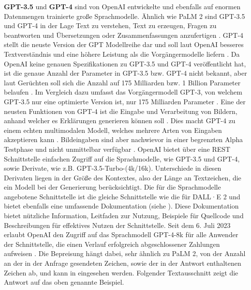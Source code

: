\textbf{GPT-3.5} \cite{openai-gpt-sep-2021} und \textbf{GPT-4} \cite{openai-gpt-sep-2021} sind von OpenAI entwickelte und ebenfalls auf enormen Datenmengen trainierte große Sprachmodelle.
Ähnlich wie PaLM 2 sind GPT-3.5 und GPT-4 in der Lage Text zu verstehen, Text zu erzeugen, Fragen zu beantworten und Übersetzungen oder Zusammenfassungen anzufertigen \cite{gpt3-paper}.
GPT-4 stellt die neuste Version der GPT Modellreihe dar und soll laut OpenAI besseres Textverständnis und eine höhere Leistung als die Vorgängermodelle liefern \cite{openai-gpt-4-announcement}.
Da OpenAI keine genauen Spezifikationen zu GPT-3.5 und GPT-4 veröffentlicht hat, ist die genaue Anzahl der Parameter in GPT-3.5 bzw. GPT-4 nicht bekannt, aber laut Gerüchten soll sich die Anzahl auf 175 Milliarden bzw. 1 Billion Parameter belaufen \cite{decoder-gpt-4-parameter-count}.
Im Vergleich dazu umfasst das Vorgängermodell GPT-3, von welchem GPT-3.5 nur eine optimierte Version ist, nur 175 Milliarden Parameter \cite{gpt3-paper}.
Eine der neusten Funktionen von GPT-4 ist die Eingabe und Verarbeitung von Bildern, anhand welcher es Erklärungen generieren können soll \cite{openai-gpt-4-announcement}. 
Dies macht GPT-4 zu einem echten multimodalen Modell, welches mehrere Arten von Eingaben akzeptieren kann \cite{openai-gpt-4-announcement}.
Bildeingaben sind aber nachwievor in einer begrenzten Alpha Testphase und nicht unmittelbar verfügbar \cite{openai-gpt-4-announcement}.
OpenAI bietet über eine REST Schnittstelle einfachen Zugriff auf die Sprachmodelle, wie GPT-3.5 und GPT-4, sowie Derivate, wie z.B. GPT-3.5-Turbo-(4k/16k).
Unterschiede in diesen Derivaten liegen in der Größe des Kontextes, also der Länge an Textzeichen, die ein Modell bei der Generierung berücksichtigt.
Die für die Sprachmodelle angebotene Schnittstelle ist die gleiche Schnittstelle wie die für DALL·E 2 und bietet ebenfalls eine umfassende Dokumentation (siehe \cite{openai-api-doc}).
Diese Dokumentation bietet nützliche Information, Leitfaden zur Nutzung, Beispiele für Quellcode und Beschreibungen für effektives Nutzen der Schnittstelle.
Seit dem 6. Juli 2023 erlaubt OpenAI den Zugriff auf das Sprachmodell GPT-4-8k für alle Anwender der Schnittstelle, die einen Verlauf erfolgreich abgeschlossener Zahlungen aufweisen \cite{openai-gpt4-access}.
Die Bepreisung hängt dabei, sehr ähnlich zu PaLM 2, von der Anzahl an der in der Anfrage gesendeten Zeichen, sowie der in der Antwort enthaltenen Zeichen ab, und kann in \cite{openai-pricing} eingesehen werden.
Folgender Textausschnitt zeigt die Antwort auf das oben genannte Beispiel.

